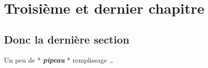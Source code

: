 \chapter{Troisième et dernier chapitre}
\section{Donc la dernière section}
Un peu de * \textbf{\emph{pipeau}}  * remplissage \newline
\dots
